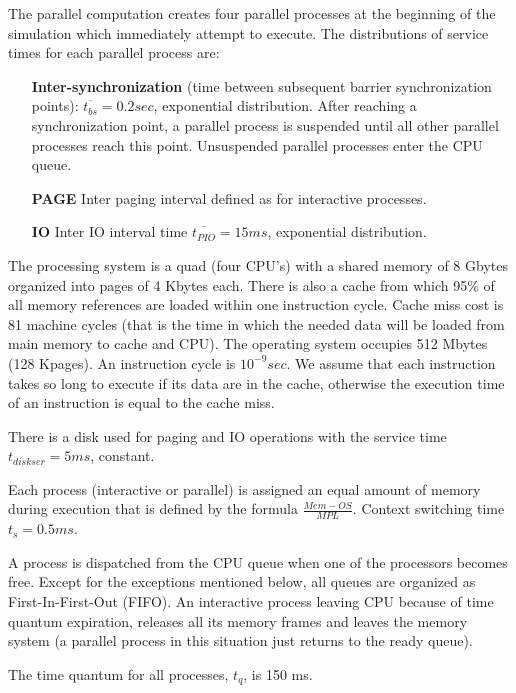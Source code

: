 \documentclass[12pt,letterpaper]{article}
\begin{document}
The parallel computation creates four parallel processes at the beginning of the simulation
which immediately attempt to execute. The distributions of service times for each parallel
process are:
\begin{itemize}
\item[\bf{Inter-synchronization}] (time between subsequent barrier synchronization points): $\overline{t_{bs}} =
0.2sec$, exponential distribution. After reaching a synchronization point, a parallel
process is suspended until all other parallel processes reach this point. Unsuspended
parallel processes enter the CPU queue.
\item[\bf{PAGE}] Inter paging interval defined as for interactive processes.
\item[\bf{IO}] Inter IO interval time $\overline{t_{PIO}} = 15ms$, exponential distribution.
\end{itemize}
The processing system is a quad (four CPU's) with a shared memory of 8 Gbytes
organized into pages of 4 Kbytes each. There is also a cache from which 95\% of all
memory references are loaded within one instruction cycle. Cache miss cost is 81 machine
cycles (that is the time in which the needed data will be loaded from main memory to
cache and CPU). The operating system occupies 512 Mbytes (128 Kpages). An instruction
cycle is $10^{-9}sec$. We assume that each instruction takes so long to execute if its data are
in the cache, otherwise the execution time of an instruction is equal to the cache miss.

There is a disk used for paging and IO operations with the service time $t_{diskser} = 5ms$,
constant.

Each process (interactive or parallel) is assigned an equal amount of memory during
execution that is defined by the formula $\frac{Mem-OS}{MPL}$. Context switching time $t_s = 0.5ms$.

A process is dispatched from the CPU queue when one of the processors becomes free.
Except for the exceptions mentioned below, all queues are organized as First-In-First-Out
(FIFO). An interactive process leaving CPU because of time quantum expiration, releases
all its memory frames and leaves the memory system (a parallel process in this situation
just returns to the ready queue).

The time quantum for all processes, $t_q$, is 150 ms.
\end{document}
